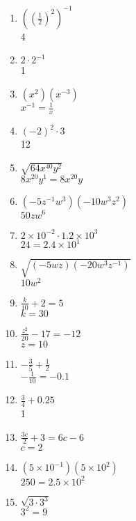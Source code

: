 \documentclass[12pt]{article}
\begin{document}
\begin{multicols}{2}
\begin{enumerate}
	\item \( ((\frac{1}{2})^{2})^{-1} \) \\
		4

	\item \( 2 \cdot 2^{-1} \) \\
		1

	\item \( (x^{2})(x^{-3}) \) \\
		\( x^{-1} = \frac{1}{x} \)

	\item \( (-2)^{2} \cdot 3 \) \\
		12

	\item \( \sqrt{64x^{40}y^{2}} \) \\
		\( 8x^{20}y^{1} = 8x^{20}y \)

	\item \( (-5z^{-1}w^{3})(-10w^{3}z^{2}) \) \\
		\( 50zw^{6} \)

	\item \( 2 \times 10^{-2} \cdot 1.2 \times 10^{3}\) \\
		\( 24 = 2.4 \times 10^{1} \)

	\item \( \sqrt{ (-5wz)(-20w^{3}z^{-1}) } \) \\
		\( 10w^{2} \)

	\item \( \frac{k}{10} + 2 = 5 \) \\
		\( k = 30 \)

	\item \( \frac{z^{2}}{20} - 17 = -12 \) \\
		\( z = 10 \)

	\item \( -\frac{3}{5} + \frac{1}{2} \) \\
		\( -\frac{1}{10} = -0.1 \)

	\item \( \frac{3}{4} + 0.25 \) \\
		1

	\item \( \frac{3c}{2} + 3 = 6c - 6 \) \\
		\( c = 2 \)

	\item \( (5 \times 10^{-1})(5 \times 10^{2}) \) \\
		\( 250 = 2.5 \times 10^{2} \)

	\item \( \sqrt{3\cdot3^{3}} \) \\
		\( 3^{2} = 9 \)


\end{enumerate}
\end{multicols}
\end{document}
